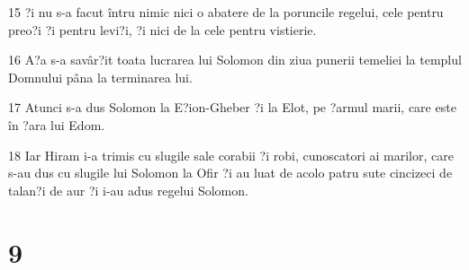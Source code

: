 \par 15 ?i nu s-a facut întru nimic nici o abatere de la poruncile regelui, cele pentru preo?i ?i pentru levi?i, ?i nici de la cele pentru vistierie.
\par 16 A?a s-a savâr?it toata lucrarea lui Solomon din ziua punerii temeliei la templul Domnului pâna la terminarea lui.
\par 17 Atunci s-a dus Solomon la E?ion-Gheber ?i la Elot, pe ?armul marii, care este în ?ara lui Edom.
\par 18 Iar Hiram i-a trimis cu slugile sale corabii ?i robi, cunoscatori ai marilor, care s-au dus cu slugile lui Solomon la Ofir ?i au luat de acolo patru sute cincizeci de talan?i de aur ?i i-au adus regelui Solomon.

\chapter{9}

